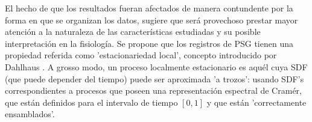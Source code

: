 \documentclass[12pt,a4paper]{mitthesis}
\newtheorem{defn}{Definici\'on}
\newcommand{\intPI}{\int_{-\pi}^{\pi}}
\newcommand{\Cov}[1]{\mathrm{Cov}\left( #1 \right)}
\newcommand{\abso}[1]{\left| #1 \right|}
\begin{document}
El hecho de que los resultados fueran afectados de manera contundente por la forma en que se 
organizan los datos, sugiere que ser\'a provechoso prestar mayor atenci\'on a la naturaleza de las 
caracter\'isticas estudiadas y su posible interpretaci\'on en la fisiolog\'ia.
Se propone que los registros de PSG tienen una propiedad referida como 'estacionariedad local',
concepto introducido por Dahlhaus \cite{Dahlhaus97}.
A grosso modo, un proceso localmente estacionario es aqu\'el cuya SDF (que puede depender del 
tiempo) puede ser aproximada 'a trozos': usando SDF's correspondientes a procesos que poseen una 
representaci\'on espectral de Cram\'er, que est\'an definidos para el intervalo de tiempo $[0,1]$ 
y que est\'an 'correctamente ensamblados'.

\end{document}
